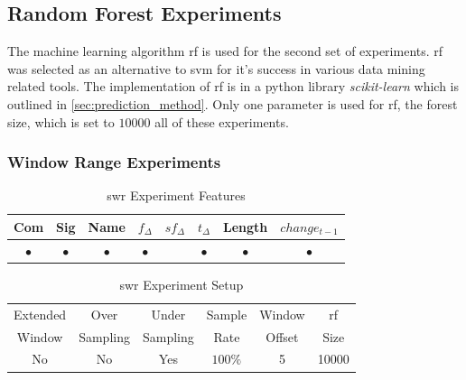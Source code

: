 \subsection{Random Forest Experiments}
\label{sec:rf_experiments}

The machine learning algorithm \gls{rf} is used for the second set of experiments. \gls{rf} was selected as an alternative to \gls{svm} for it's success in various data mining related tools. The implementation of \gls{rf} is in a python library \textit{scikit-learn} which is outlined in \autoref{sec:prediction_method}. Only one parameter is used for \gls{rf}, the forest size, which is set to $10000$ all of these experiments.

\subsubsection{Window Range Experiments}
\label{sec:rf_swr_experiment}

\begin{table}[h]
\begin{center}

    \begin{tabular}{|c|c|c|c|c|c|c|c|}
        \hline
        Com & Sig & Name & $f_{\Delta}$ & $sf_{\Delta}$ & $t_\Delta$ & Length & $change_{t-1}$ \\
         \hline
        $\bullet$ & $\bullet$ & $\bullet$ & $\bullet$ & & $\bullet$ & $\bullet$ & $\bullet$ \\ \hline
    \end{tabular}
    \caption{\gls{swr} Experiment Features}
    \label{tab:rf_window_range_experiment_features}
\end{center}

\end{table}

\begin{table}[h]
\begin{center}

    \begin{tabular}{|c|c|c|c|c|c|}
        \hline
        Extended & Over & Under & Sample & Window & \gls{rf} \\
        Window & Sampling & Sampling & Rate & Offset & Size \\ \hline
        No & No & Yes & $100\%$ & 5 & 10000 \\ \hline
    \end{tabular}
    \caption{\gls{swr} Experiment Setup}
    \label{tab:rf_window_range_experiment_setup}
\end{center}

\end{table}


